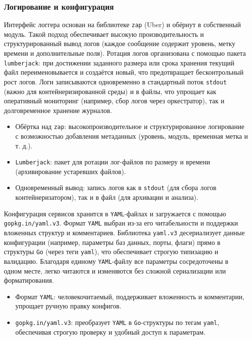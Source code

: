 \subsubsection*{Логирование и конфигурация}
Интерфейс логгера основан на библиотеке \texttt{zap} (Uber) и обёрнут в собственный модуль. Такой подход обеспечивает высокую производительность и структурированный вывод логов (каждое сообщение содержит уровень, метку времени и дополнительные поля). Ротация логов организована с помощью пакета \texttt{lumberjack}: при достижении заданного размера или срока хранения текущий файл переименовывается и создаётся новый, что предотвращает бесконтрольный рост логов. Логи записываются одновременно в стандартный поток \texttt{stdout} (важно для контейнеризированной среды) и в файлы, что упрощает как оперативный мониторинг (например, сбор логов через оркестратор), так и долговременное хранение журналов.
\begin{itemize}
    \item Обёртка над \texttt{zap}: высокопроизводительное и структурированное логирование с возможностью добавления метаданных (уровень, модуль, временная метка и т. д.).
    \item \texttt{Lumberjack}: пакет для ротации лог-файлов по размеру и времени (архивирование устаревших файлов).
    \item Одновременный вывод: запись логов как в \texttt{stdout} (для сбора логов контейнеризатором), так и в файл (для архивации и анализа).
\end{itemize}
\noindent Конфигурация сервисов хранится в \texttt{YAML}-файлах и загружается с помощью \texttt{gopkg.in/yaml.v3}. Формат \texttt{YAML} выбран из-за его читабельности и поддержки вложенных структур и комментариев. Библиотека \texttt{yaml.v3} десериализует данные конфигурации (например, параметры баз данных, порты, флаги) прямо в структуры \texttt{Go} (через теги \texttt{yaml}), что обеспечивает строгую типизацию и валидацию. Благодаря единому \texttt{YAML}-файлу все параметры сосредоточены в одном месте, легко читаются и изменяются без сложной сериализации или форматирования.
\begin{itemize}
    \item Формат \texttt{YAML}: человекочитаемый, поддерживает вложенность и комментарии, упрощает ручную правку конфигов.
    \item \texttt{gopkg.in/yaml.v3}: преобразует \texttt{YAML} в \texttt{Go}-структуры по тегам \texttt{yaml}, обеспечивая строгую проверку и удобный доступ к параметрам.
\end{itemize}

